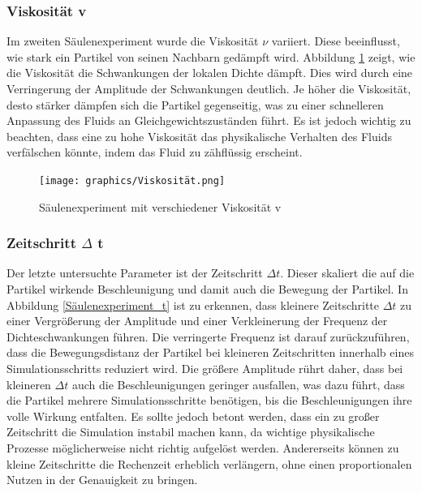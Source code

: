 \documentclass[a4paper, 12pt]{article}
\begin{document}
\subsubsection{Viskosität v}
Im zweiten Säulenexperiment wurde die Viskosität \(\nu\) variiert. Diese beeinflusst, wie stark ein Partikel von seinen Nachbarn gedämpft wird. Abbildung \ref{Säulenexperiment_v} zeigt, wie die Viskosität die Schwankungen der lokalen Dichte dämpft. Dies wird durch eine Verringerung der Amplitude der Schwankungen deutlich. Je höher die Viskosität, desto stärker dämpfen sich die Partikel gegenseitig, was zu einer schnelleren Anpassung des Fluids an Gleichgewichtszuständen führt. Es ist jedoch wichtig zu beachten, dass eine zu hohe Viskosität das physikalische Verhalten des Fluids verfälschen könnte, indem das Fluid zu zähflüssig erscheint.

\begin{figure}[H]
	\centering
	\texttt{[image: graphics/Viskosität.png]}	
	\caption{Säulenexperiment mit verschiedener Viskosität v}
	\label{Säulenexperiment_v}
\end{figure}

\subsubsection{Zeitschritt $\Delta$ t}
Der letzte untersuchte Parameter ist der Zeitschritt \(\Delta t\). Dieser skaliert die auf die Partikel wirkende Beschleunigung und damit auch die Bewegung der Partikel. In Abbildung \ref{Säulenexperiment_t} ist zu erkennen, dass kleinere Zeitschritte \(\Delta t\) zu einer Vergrößerung der Amplitude und einer Verkleinerung der Frequenz der Dichteschwankungen führen. Die verringerte Frequenz ist darauf zurückzuführen, dass die Bewegungsdistanz der Partikel bei kleineren Zeitschritten innerhalb eines Simulationsschritts reduziert wird. Die größere Amplitude rührt daher, dass bei kleineren \(\Delta t\) auch die Beschleunigungen geringer ausfallen, was dazu führt, dass die Partikel mehrere Simulationsschritte benötigen, bis die Beschleunigungen ihre volle Wirkung entfalten. Es sollte jedoch betont werden, dass ein zu großer Zeitschritt die Simulation instabil machen kann, da wichtige physikalische Prozesse möglicherweise nicht richtig aufgelöst werden. Andererseits können zu kleine Zeitschritte die Rechenzeit erheblich verlängern, ohne einen proportionalen Nutzen in der Genauigkeit zu bringen.
\end{document}
